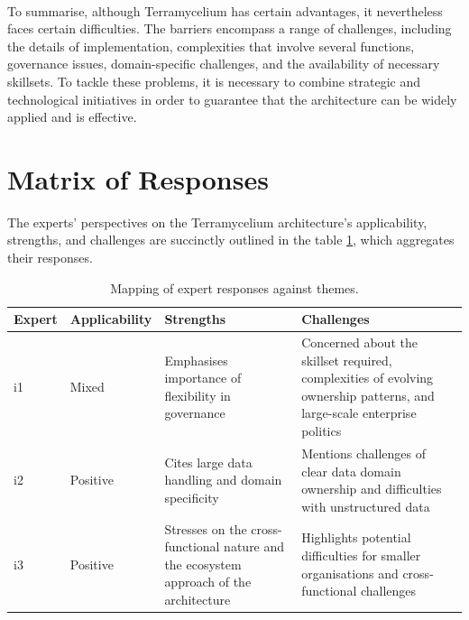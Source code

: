 \documentclass{ieeeaccess}
\begin{document}
\,

To summarise, although Terramycelium has certain advantages, it nevertheless faces certain difficulties. The barriers encompass a range of challenges, including the details of implementation, complexities that involve several functions, governance issues, domain-specific challenges, and the availability of necessary skillsets. To tackle these problems, it is necessary to combine strategic and technological initiatives in order to guarantee that the architecture can be widely applied and is effective.

\section{Matrix of Responses} \label{expertOpinion_matrixResponses}

The experts' perspectives on the Terramycelium architecture's applicability, strengths, and challenges are succinctly outlined in the table \ref{tab:responses}, which aggregates their responses.

\begin{table}[h]

  \centering

  \caption{Mapping of expert responses against themes.}

  \begin{tabular}{@{}llp{}p{}@{}}

  \hline

  Expert & Applicability & Strengths & Challenges \\

  \hline

  i1 & Mixed & Emphasises importance of flexibility in governance & Concerned about the skillset required, complexities of evolving ownership patterns, and large-scale enterprise politics \\

  i2 & Positive & Cites large data handling and domain specificity & Mentions challenges of clear data domain ownership and difficulties with unstructured data \\

  i3 & Positive & Stresses on the cross-functional nature and the ecosystem approach of the architecture & Highlights potential difficulties for smaller organisations and cross-functional challenges \\

  \hline

  \end{tabular}

  \label{tab:responses}

\end{table}
\end{document}
